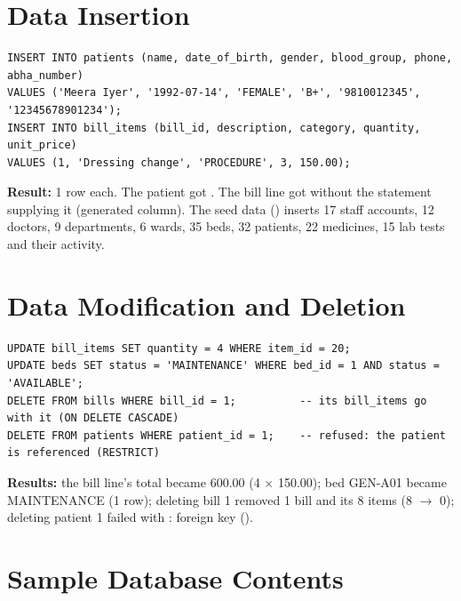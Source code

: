 \section{Data Insertion}
\begin{lstlisting}[caption={Inserting a patient and a bill line (results below)}]
INSERT INTO patients (name, date_of_birth, gender, blood_group, phone, abha_number)
VALUES ('Meera Iyer', '1992-07-14', 'FEMALE', 'B+', '9810012345', '12345678901234');
INSERT INTO bill_items (bill_id, description, category, quantity, unit_price)
VALUES (1, 'Dressing change', 'PROCEDURE', 3, 150.00);
\end{lstlisting}
\textbf{Result:} 1 row each. The patient got . The bill line got 
without the statement supplying it (generated column). The seed data () inserts 17 staff
accounts, 12 doctors, 9 departments, 6 wards, 35 beds, 32 patients, 22 medicines, 15 lab tests and their activity.

\section{Data Modification and Deletion}
\begin{lstlisting}[caption={UPDATE and DELETE, including a cascade and a refused delete (results below)}]
UPDATE bill_items SET quantity = 4 WHERE item_id = 20;
UPDATE beds SET status = 'MAINTENANCE' WHERE bed_id = 1 AND status = 'AVAILABLE';
DELETE FROM bills WHERE bill_id = 1;          -- its bill_items go with it (ON DELETE CASCADE)
DELETE FROM patients WHERE patient_id = 1;    -- refused: the patient is referenced (RESTRICT)
\end{lstlisting}
\textbf{Results:} the bill line's total became 600.00 (4 $\times$ 150.00); bed GEN-A01 became MAINTENANCE (1 row);
deleting bill 1 removed 1 bill and its 8 items (8 $\to$ 0); deleting patient 1 failed with
: foreign key  ().

\section{Sample Database Contents}
\begin{table}[H]\centering
\caption{Sample contents of ,  and beds per ward ( on the test database)}\label{tab:sample}
\hfill\hfill
\end{table}


